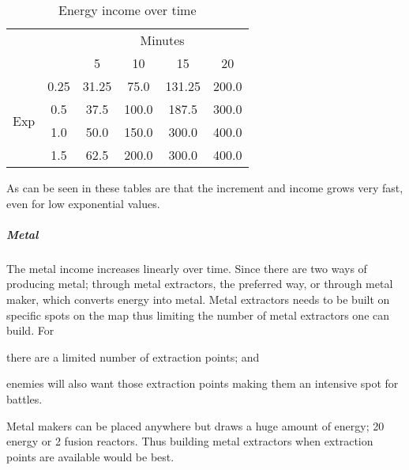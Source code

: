 \begin{table}[htb]
\caption{Energy income over time}\label{tab:energy_income}
\begin{center}
\begin{tabular}{ccc|c|c|c|}
\toprule
& & \multicolumn{4}{c}{Minutes} \\ \cline{3-6}
& & \multicolumn{1}{|c|}{5} & 10 & 15 & 20 \\ \cline{2-6}
\multirow{4}{*}{Exp} &
\multicolumn{1}{|c|}{0.25} & 31.25 & 75.0 & 131.25 & 200.0 \\ \cline{2-6}
& \multicolumn{1}{|c|}{0.5} & 37.5 & 100.0 & 187.5 & 300.0 \\ \cline{2-6}
& \multicolumn{1}{|c|}{1.0} & 50.0 & 150.0 & 300.0 & 400.0 \\ \cline{2-6}
& \multicolumn{1}{|c|}{1.5} & 62.5 & 200.0 & 300.0 & 400.0 \\ \cline{2-6}
\bottomrule
\end{tabular}
\end{center}
\end{table}

As can be seen in these tables are that the increment and income grows very fast, even for low
exponential values.

\subparagraph{Metal}
The metal income increases linearly over time. Since there are two ways of producing metal; through
metal extractors, the preferred way, or through metal maker, which converts energy into metal. Metal
extractors needs to be built on specific spots on the map thus limiting the number of metal
extractors one can build. For
\begin{inparaenum}[1)]
\item there are a limited number of extraction points; and
\item enemies will also want those extraction points making them an intensive spot for battles.
\end{inparaenum}
Metal makers can be
placed anywhere but draws a huge amount of energy; 20 energy or 2 fusion reactors. Thus building
metal extractors when extraction points are available would be best.

